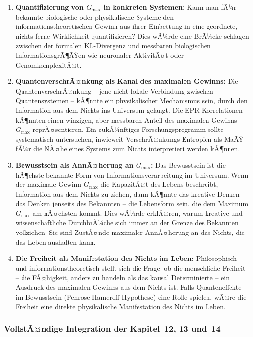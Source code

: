 ﻿\documentclass[12pt,a4paper]{report}
\begin{document}
\begin{enumerate}
	\item \textbf{Quantifizierung von $G_{\max}$ in konkreten Systemen:} Kann man fÃ¼r bekannte biologische oder physikalische Systeme den informationstheoretischen Gewinn aus ihrer Einbettung in eine geordnete, \glqq nichts-ferne\grqq{} Wirklichkeit quantifizieren? Dies wÃ¼rde eine BrÃ¼cke schlagen zwischen der formalen KL-Divergenz und messbaren biologischen InformationsgrÃ¶ÃŸen wie neuronaler AktivitÃ¤t oder GenomkomplexitÃ¤t.

	\item \textbf{QuantenverschrÃ¤nkung als Kanal des maximalen Gewinns:} Die QuantenverschrÃ¤nkung -- jene nicht-lokale Verbindung zwischen Quantensystemen -- kÃ¶nnte ein physikalischer Mechanismus sein, durch den Information aus dem Nichts ins Universum gelangt. Die EPR-Korrelationen kÃ¶nnten einen winzigen, aber messbaren Anteil des maximalen Gewinns $G_{\max}$ reprÃ¤sentieren. Ein zukÃ¼nftiges Forschungsprogramm sollte systematisch untersuchen, inwieweit VerschrÃ¤nkungs-Entropien als MaÃŸ fÃ¼r die NÃ¤he eines Systems zum Nichts interpretiert werden kÃ¶nnen.

	\item \textbf{Bewusstsein als AnnÃ¤herung an $G_{\max}$:} Das Bewusstsein ist die hÃ¶chste bekannte Form von Informationsverarbeitung im Universum. Wenn der maximale Gewinn $G_{\max}$ die KapazitÃ¤t des Lebens beschreibt, Information aus dem Nichts zu ziehen, dann kÃ¶nnte das kreative Denken -- das Denken jenseits des Bekannten -- die Lebensform sein, die dem Maximum $G_{\max}$ am nÃ¤chsten kommt. Dies wÃ¼rde erklÃ¤ren, warum kreative und wissenschaftliche DurchbrÃ¼che sich immer an der Grenze des Bekannten vollziehen: Sie sind ZustÃ¤nde maximaler AnnÃ¤herung an das Nichts, die das Leben aushalten kann.

	\item \textbf{Die Freiheit als Manifestation des Nichts im Leben:} Philosophisch und informationstheoretisch stellt sich die Frage, ob die menschliche Freiheit -- die FÃ¤higkeit, anders zu handeln als das kausal Determinierte -- ein Ausdruck des maximalen Gewinns aus dem Nichts ist. Falls Quanteneffekte im Bewusstsein (Penrose-Hameroff-Hypothese) eine Rolle spielen, wÃ¤re die Freiheit eine direkte physikalische Manifestation des Nichts im Leben.
\end{enumerate}

\subsubsection{VollstÃ¤ndige Integration der Kapitel~12, 13 und~14}
\end{document}
